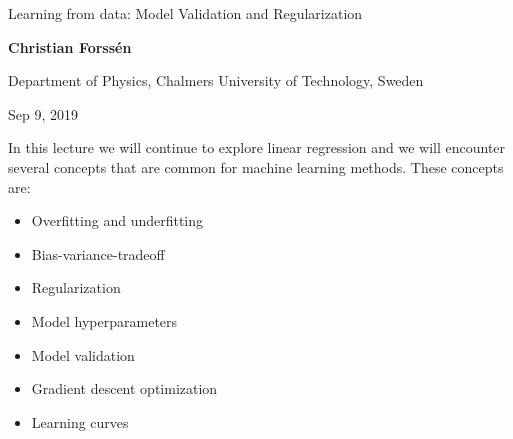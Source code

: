 \documentclass[%
oneside,                 %
final,                   %
10pt]{article}
\begin{document}

\newcommand{\exercisesection}[1]{\subsection*{#1}}







\thispagestyle{empty}

\begin{center}
{\LARGE\bf
\begin{spacing}{1.25}
Learning from data: Model Validation and Regularization
\end{spacing}
}
\end{center}


\begin{center}
{\bf Christian Forssén}
\end{center}

    \begin{center}
\centerline{{\small Department of Physics, Chalmers University of Technology, Sweden}}
\end{center}
    

\begin{center}
Sep 9, 2019
\end{center}

\vspace{1cm}


In this lecture we will continue to explore linear regression and we will encounter several concepts that are common for machine learning methods. These concepts are:
\begin{itemize}
  \item Overfitting and underfitting

  \item Bias-variance-tradeoff

  \item Regularization

  \item Model hyperparameters

  \item Model validation

  \item Gradient descent optimization

  \item Learning curves
\end{itemize}
\end{document}
